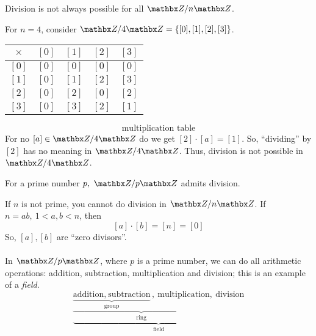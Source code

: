 \vspace*{1em}

Division is not always possible for all $\zz/n\zz$.
\begin{example}
For $n = 4$, consider $\zz/4\zz = \set{[0],[1],[2],[3]}$.\\[1em]
\begin{center}
{\renewcommand{\arraystretch}{1.5}%
\begin{tabular}{c|cccc}
$\times$ & $[0]$ & $[1]$ & $[2]$ & $[3]$\\
\hline
$[0]$ & $[0]$ & $[0]$ & $[0]$ & $[0]$\\
$[1]$ & $[0]$ & $[1]$ & $[2]$ & $[3]$\\
$[2]$ & $[0]$ & $[2]$ & $[0]$ & $[2]$\\
$[3]$ & $[0]$ & $[3]$ & $[2]$ & $[1]$
\end{tabular}
}
\end{center}
\[\text{multiplication table}\]
For no $[a] \in \zz/4\zz$ do we get $[2]\cdot [a] = [1]$. So, ``dividing'' by $[2]$ has no meaning in $\zz/4\zz$. Thus, division is not possible in $\zz/4\zz$.
\end{example}

\vspace*{1em}

\begin{discussion}[Fact]
For a prime number $p,\ \zz/p\zz$ admits division.
\item[] If $n$ is not prime, you cannot do division in $\zz/n\zz$. If $n = ab,\ 1 < a,b < n$, then 
\[ [a] \cdot [b] = [n] = [0]\]
So, $[a],[b]$ are ``zero divisors''.\\
\\
In $\zz/p\zz$, where $p$ is a prime number, we can do all arithmetic operations: addition, subtraction, multiplication and division; this is an example of a \emph{field}.
\[\underbrace{\underbrace{\underbrace{\text{addition},\ \text{subtraction}}_{\text{group}},\ \text{multiplication}}_{\text{ring}},\ \text{division}}_{\text{field}}\]
\end{discussion}